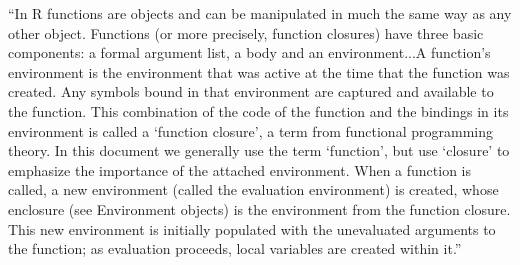  ``In R functions are objects and can be manipulated in much the same way as any other object. Functions (or more precisely, function closures) have three basic components: a formal argument list, a body and an environment...A function’s environment is the environment that was active at the time that the function was created. Any symbols bound in that environment are captured and available to the function. This combination of the code of the function and the bindings in its environment is called a ‘function closure’, a term from functional programming theory. In this document we generally use the term ‘function’, but use ‘closure’ to emphasize the importance of the attached environment.  When a function is called, a new environment (called the evaluation environment) is created, whose enclosure (see Environment objects) is the environment from the function closure. This new environment is initially populated with the unevaluated arguments to the function; as evaluation proceeds, local variables are created within it.''




